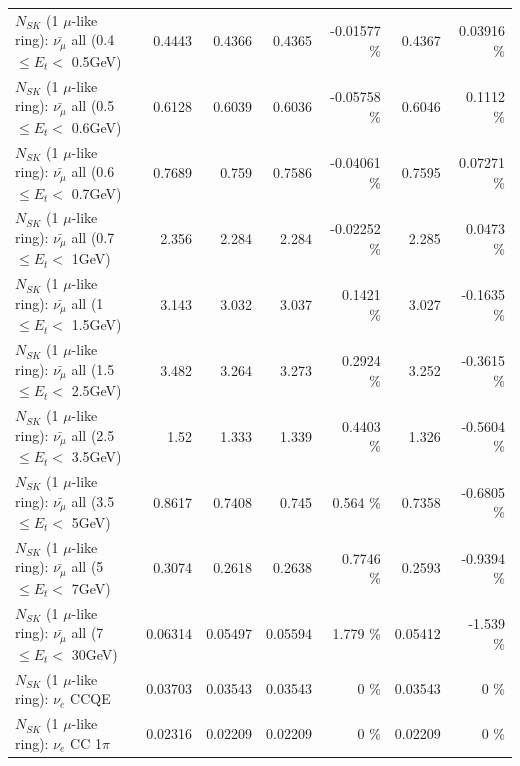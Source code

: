 \begin{table}
\begin{tabular}{| l | r | r | r  r | r  r |}
 $N_{SK}$ (1 $\mu$-like ring): $\bar{\nu_{\mu}}$ all (0.4 $\leq E_{t} <$ 0.5GeV) &          0.4443 &          0.4366 &          0.4365 & -0.01577 \%  &          0.4367 &  0.03916 \%  \\ 
 $N_{SK}$ (1 $\mu$-like ring): $\bar{\nu_{\mu}}$ all (0.5 $\leq E_{t} <$ 0.6GeV) &          0.6128 &          0.6039 &          0.6036 & -0.05758 \%  &          0.6046 &   0.1112 \%  \\ 
 $N_{SK}$ (1 $\mu$-like ring): $\bar{\nu_{\mu}}$ all (0.6 $\leq E_{t} <$ 0.7GeV) &          0.7689 &           0.759 &          0.7586 & -0.04061 \%  &          0.7595 &  0.07271 \%  \\ 
   $N_{SK}$ (1 $\mu$-like ring): $\bar{\nu_{\mu}}$ all (0.7 $\leq E_{t} <$ 1GeV) &           2.356 &           2.284 &           2.284 & -0.02252 \%  &           2.285 &   0.0473 \%  \\ 
   $N_{SK}$ (1 $\mu$-like ring): $\bar{\nu_{\mu}}$ all (1 $\leq E_{t} <$ 1.5GeV) &           3.143 &           3.032 &           3.037 &   0.1421 \%  &           3.027 &  -0.1635 \%  \\ 
 $N_{SK}$ (1 $\mu$-like ring): $\bar{\nu_{\mu}}$ all (1.5 $\leq E_{t} <$ 2.5GeV) &           3.482 &           3.264 &           3.273 &   0.2924 \%  &           3.252 &  -0.3615 \%  \\ 
 $N_{SK}$ (1 $\mu$-like ring): $\bar{\nu_{\mu}}$ all (2.5 $\leq E_{t} <$ 3.5GeV) &            1.52 &           1.333 &           1.339 &   0.4403 \%  &           1.326 &  -0.5604 \%  \\ 
   $N_{SK}$ (1 $\mu$-like ring): $\bar{\nu_{\mu}}$ all (3.5 $\leq E_{t} <$ 5GeV) &          0.8617 &          0.7408 &           0.745 &    0.564 \%  &          0.7358 &  -0.6805 \%  \\ 
     $N_{SK}$ (1 $\mu$-like ring): $\bar{\nu_{\mu}}$ all (5 $\leq E_{t} <$ 7GeV) &          0.3074 &          0.2618 &          0.2638 &   0.7746 \%  &          0.2593 &  -0.9394 \%  \\ 
    $N_{SK}$ (1 $\mu$-like ring): $\bar{\nu_{\mu}}$ all (7 $\leq E_{t} <$ 30GeV) &         0.06314 &         0.05497 &         0.05594 &    1.779 \%  &         0.05412 &   -1.539 \%  \\ 
\hline
\hline
\hline
                                      $N_{SK}$ (1 $\mu$-like ring): $\nu_e$ CCQE &         0.03703 &         0.03543 &         0.03543 &        0 \%  &         0.03543 &        0 \%  \\ 
                                 $N_{SK}$ (1 $\mu$-like ring): $\nu_e$ CC 1$\pi$ &         0.02316 &         0.02209 &         0.02209 &        0 \%  &         0.02209 &        0 \%  \\ 

\end{tabular}
\end{table}
